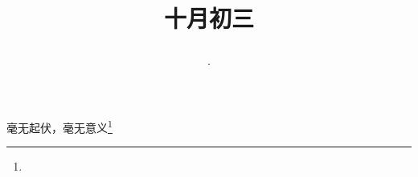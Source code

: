\title{\date[d=3,m=11,y=2024][year:cn-y,年,month:cn,day:cn,日,·,weekday]·十月初三 }
毫无起伏，毫无意义\footnote{ }

